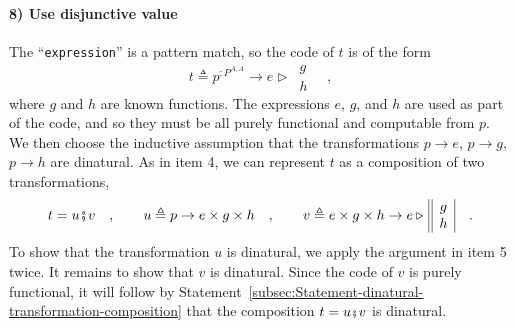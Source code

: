 \paragraph{8) Use disjunctive value }

The \textsf{``}\lstinline!expression!\textsf{''} is a pattern match, so the code
of $t$ is of the form 
\[
t\triangleq p^{:P^{A,A}}\rightarrow e\triangleright\,\begin{array}{||c|}
g\\
h
\end{array}\quad,
\]
where $g$ and $h$ are known functions. The expressions $e$, $g$,
and $h$ are used as part of the code, and so they must be all purely
functional and computable from $p$. We then choose the inductive
assumption that the transformations $p\rightarrow e$, $p\rightarrow g$,
$p\rightarrow h$ are dinatural. As in item 4, we can represent $t$
as a composition of two transformations, 
\[
t=u\bef v\quad,\quad\quad u\triangleq p\rightarrow e\times g\times h\quad,\quad\quad v\triangleq e\times g\times h\rightarrow e\triangleright\,\begin{array}{||c|}
g\\
h
\end{array}\quad.
\]
To show that the transformation $u$ is dinatural, we apply the argument
in item 5 twice. It remains to show that $v$ is dinatural. Since
the code of $v$ is purely functional, it will follow by Statement~\ref{subsec:Statement-dinatural-transformation-composition}
that the composition $t=u\bef v$ is dinatural.

